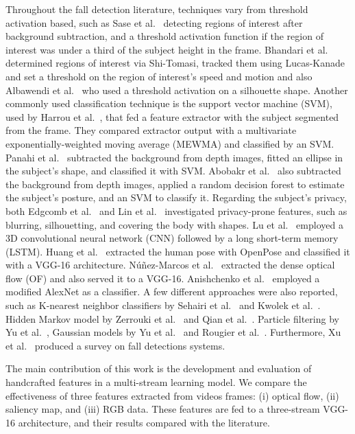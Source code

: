 \documentclass[conference]{IEEEtran}
\begin{document}
Throughout the fall detection literature, techniques vary from threshold activation based, such as Sase et al.~\cite{sase2018human} detecting regions of interest after background subtraction, and a threshold activation function if the region of interest was under a third of the subject height in the frame. Bhandari et al.~\cite{bhandari2017novel} determined regions of interest via Shi-Tomasi, tracked them using Lucas-Kanade and set a threshold on the region of interest's speed and motion and also Albawendi et al.~\cite{albawendi2018video} who used a threshold activation on a silhouette shape. Another commonly used classification technique is the support vector machine (SVM), used by Harrou et al.~\cite{harrou2017vision}, that fed a feature extractor with the subject segmented from the frame. They compared extractor output with a multivariate exponentially-weighted moving average (MEWMA) and classified by an SVM. Panahi et al.~\cite{panahi2018human} subtracted the background from depth images, fitted an ellipse in the subject's shape, and classified it with SVM. Abobakr et al.~\cite{abobakr2017skeleton} also subtracted the background from depth images, applied a random decision forest to estimate the subject's posture, and an SVM to classify it. Regarding the subject's privacy, both Edgcomb et al.~\cite{edgcomb2012automated} and Lin et al.~\cite{lin2013fall} investigated privacy-prone features, such as blurring, silhouetting, and covering the body with shapes. Lu et al.~\cite{lu2019deep} employed a 3D convolutional neural network (CNN) followed by a long short-term memory (LSTM). Huang et al.~\cite{huang2018video} extracted the human pose with OpenPose and classified it with a VGG-16 architecture. N\'u\~nez-Marcos et al.~\cite{nunez2017vision} extracted the dense optical flow (OF) and also served it to a VGG-16. Anishchenko et al.~\cite{anishchenko2018machine} employed a modified AlexNet as a classifier. A few different approaches were also reported, such as K-nearest neighbor classifiers by Sehairi et al.~\cite{sehairi2018elderly} and Kwolek et al.~\cite{kwolek2015improving}. Hidden Markov model by Zerrouki et al.~\cite{zerrouki2018combined} and Qian et al.~\cite{qian2017recognizing}. Particle filtering by Yu et al.~\cite{yu2009fall}, Gaussian models by Yu et al.~\cite{yu2010robust} and Rougier et al.~\cite{rougier2011robust}. Furthermore, Xu et al.~\cite{xu2018new} produced a survey on fall detections systems.

The main contribution of this work is the development and evaluation of handcrafted features in a multi-stream learning model. We compare the effectiveness of three features extracted from videos frames: (i) optical flow, (ii) saliency map, and (iii) RGB data. These features are fed to a three-stream VGG-16 architecture, and their results compared with the literature.
\end{document}

